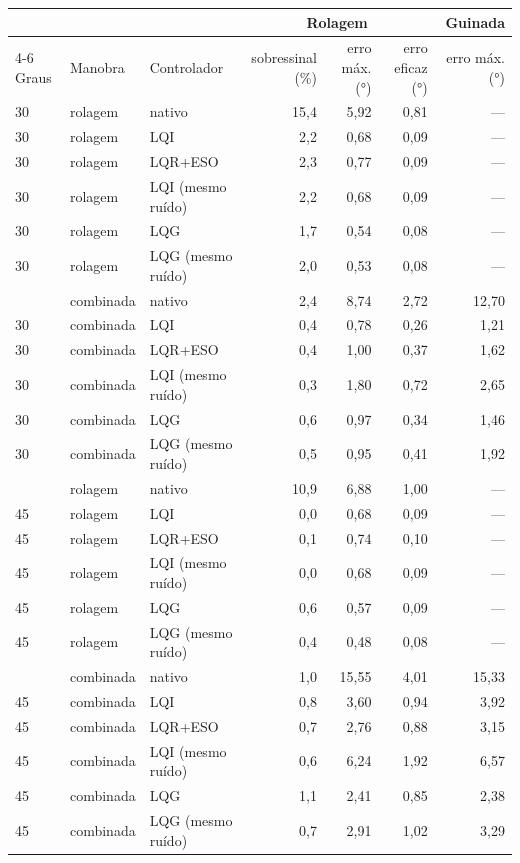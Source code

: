 \begin{tabular}{lllrrrr}
\toprule
 & & & \multicolumn{3}{c}{Rolagem} & Guinada \\
\cmidrule(lr){4-6}
Graus & Manobra & Controlador & sobressinal (\%) & erro máx. (\si{\degree}) & erro eficaz (\si{\degree}) & erro máx. (\si{\degree}) \\
\midrule
30 & rolagem & nativo & 15,4 & 5,92 & 0,81 & --- \\
30 & rolagem & LQI & 2,2 & 0,68 & 0,09 & --- \\
30 & rolagem & LQR+ESO & 2,3 & 0,77 & 0,09 & --- \\
30 & rolagem & LQI (mesmo ruído) & 2,2 & 0,68 & 0,09 & --- \\
30 & rolagem & LQG & 1,7 & 0,54 & 0,08 & --- \\
30 & rolagem & LQG (mesmo ruído) & 2,0 & 0,53 & 0,08 & --- \\
\addlinespace
30 & combinada & nativo & 2,4 & 8,74 & 2,72 & 12,70 \\
30 & combinada & LQI & 0,4 & 0,78 & 0,26 & 1,21 \\
30 & combinada & LQR+ESO & 0,4 & 1,00 & 0,37 & 1,62 \\
30 & combinada & LQI (mesmo ruído) & 0,3 & 1,80 & 0,72 & 2,65 \\
30 & combinada & LQG & 0,6 & 0,97 & 0,34 & 1,46 \\
30 & combinada & LQG (mesmo ruído) & 0,5 & 0,95 & 0,41 & 1,92 \\
\addlinespace
45 & rolagem & nativo & 10,9 & 6,88 & 1,00 & --- \\
45 & rolagem & LQI & 0,0 & 0,68 & 0,09 & --- \\
45 & rolagem & LQR+ESO & 0,1 & 0,74 & 0,10 & --- \\
45 & rolagem & LQI (mesmo ruído) & 0,0 & 0,68 & 0,09 & --- \\
45 & rolagem & LQG & 0,6 & 0,57 & 0,09 & --- \\
45 & rolagem & LQG (mesmo ruído) & 0,4 & 0,48 & 0,08 & --- \\
\addlinespace
45 & combinada & nativo & 1,0 & 15,55 & 4,01 & 15,33 \\
45 & combinada & LQI & 0,8 & 3,60 & 0,94 & 3,92 \\
45 & combinada & LQR+ESO & 0,7 & 2,76 & 0,88 & 3,15 \\
45 & combinada & LQI (mesmo ruído) & 0,6 & 6,24 & 1,92 & 6,57 \\
45 & combinada & LQG & 1,1 & 2,41 & 0,85 & 2,38 \\
45 & combinada & LQG (mesmo ruído) & 0,7 & 2,91 & 1,02 & 3,29 \\
\bottomrule
\end{tabular}
